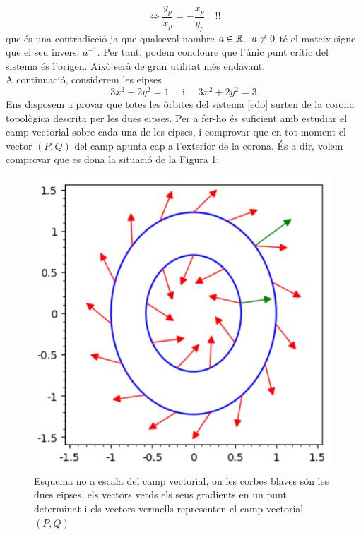 \documentclass[10pt,a4paper]{article}
\begin{document}
$$\iff\frac{y_p}{x_p}=-\frac{x_p}{y_p}\quad!!$$
que és una contradicció ja que qualsevol nombre $a\in\mathbb{R},\enskip a\neq0$ té el mateix signe que el seu invers, $a^{-1}$. Per tant, podem concloure que l'únic punt crític del sistema és l'origen. Això serà de gran utilitat més endavant.
\\
A continuació, considerem les e\lgem ipses
\begin{equation}
  3x^2+2y^2=1\quad\text{ i }\quad 3x^2+2y^2=3
\end{equation}
Ens disposem a provar que totes les òrbites del sistema \eqref{edo} surten de la corona topològica descrita per les dues e\lgem ipses. Per a fer-ho és suficient amb estudiar el camp vectorial sobre cada una de les e\lgem ipses, i comprovar que en tot moment el vector $(P,Q)$ del camp apunta cap a l'exterior de la corona. És a dir, volem comprovar que es dona la situació de la Figura \ref{grad}:
\begin{figure}[!ht]\centering
  \begin{minipage}[c]{0.5\textwidth}\centering
    \includegraphics[scale=0.7]{Images/grad}
    \caption{Esquema no a escala del camp vectorial, on les corbes blaves són les dues e\lgem ipses, els vectors verds els seus gradients en un punt determinat i els vectors vermells representen el camp vectorial $(P,Q)$}
    \label{grad}
  \end{minipage}\hspace{0.03\textwidth}
\end{figure}
\end{document}
